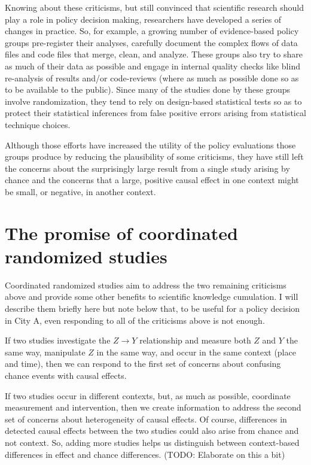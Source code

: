 \documentclass[
  11pt,
]{article}
\begin{document}
Knowing about these criticisms, but still convinced that scientific
research should play a role in policy decision making, researchers have
developed a series of changes in practice. So, for example, a growing
number of evidence-based policy groups pre-register their analyses,
carefully document the complex flows of data files and code files that
merge, clean, and analyze. These groups also try to share as much of
their data as possible and engage in internal quality checks like blind
re-analysis of results and/or code-reviews (where as much as possible
done so as to be available to the public). Since many of the studies
done by these groups involve randomization, they tend to rely on
design-based statistical tests so as to protect their statistical
inferences from false positive errors arising from statistical technique
choices.

Although those efforts have increased the utility of the policy
evaluations those groups produce by reducing the plausibility of some
criticisms, they have still left the concerns about the surprisingly
large result from a single study arising by chance and the concerns that
a large, positive causal effect in one context might be small, or
negative, in another context.

\hypertarget{the-promise-of-coordinated-randomized-studies}{%
\section{The promise of coordinated randomized
studies}\label{the-promise-of-coordinated-randomized-studies}}

Coordinated randomized studies aim to address the two remaining
criticisms above and provide some other benefits to scientific knowledge
cumulation. I will describe them briefly here but note below that, to be
useful for a policy decision in City A, even responding to all of the
criticisms above is not enough.

If two studies investigate the \(Z \rightarrow Y\) relationship and
measure both \(Z\) and \(Y\) the same way, manipulate \(Z\) in the same
way, and occur in the same context (place and time), then we can respond
to the first set of concerns about confusing chance events with causal
effects.

If two studies occur in different contexts, but, as much as possible,
coordinate measurement and intervention, then we create information to
address the second set of concerns about heterogeneity of causal
effects. Of course, differences in detected causal effects between the
two studies could also arise from chance and not context. So, adding
more studies helps us distinguish between context-based differences in
effect and chance differences. (TODO: Elaborate on this a bit)
\end{document}
